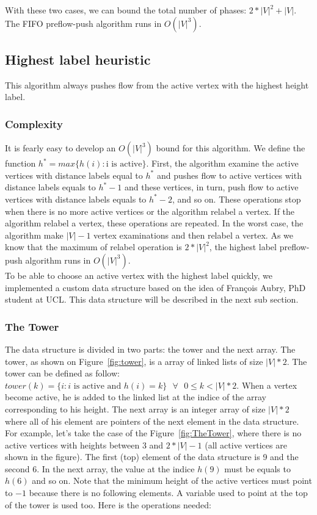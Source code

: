 With these two cases, we can bound the total number of phases: $2*|V|^2 + |V|$. The FIFO preflow-push algorithm runs in $O(|V|^3)$.

\subsection{Highest label heuristic}

This algorithm always pushes flow from the active vertex with the highest height label. 

\subsubsection{Complexity}

It is fearly easy to develop an $O(|V|^3)$ bound for this algorithm. We define the function $h^{*} = max\{h(i): \text{i is active}\}$. First, the algorithm examine the active vertices with distance labels equal to $h^{*}$ and pushes flow to active vertices with distance labels equals to $h^{*}-1$ and these vertices, in turn, push flow to active vertices with distance labels equals to $h^{*}-2$, and so on. These operations stop when there is no more active vertices or the algorithm relabel a vertex. If the algorithm relabel a vertex, these operations are repeated. In the worst case, the algorithm make $|V| - 1$ vertex examinations and then relabel a vertex. As we know that the maximum of relabel operation is $2*|V|^2$, the highest label preflow-push algorithm runs in $O(|V|^3)$.\\

To be able to choose an active vertex with the highest label quickly, we implemented a custom data structure based on the idea of Fran\c cois Aubry, PhD student at UCL. This data structure will be described in the next sub section.

\subsubsection{The Tower}

The data structure is divided in two parts: the tower and the next array. The tower, as shown on Figure~\ref{fig:tower}, is a array of linked lists of size $|V|*2$. The tower can be defined as follow: $tower(k) = \{i : i \text{ is active and } h(i) = k\} \text{ } \forall \text{ } 0 \le k < |V|*2$. When a vertex become active, he is added to the linked list at the indice of the array corresponding to his height. The next array is an integer array of size $|V|*2$ where all of his element are pointers of the next element in the data structure. For example, let's take the case of the Figure~\ref{fig:TheTower}, where there is no active vertices with heights between 3 and $2*|V|-1$ (all active vertices are shown in the figure). The first (top) element of the data structure is 9 and the second 6. In the next array, the value at the indice $h(9)$ must be equals to $h(6)$ and so on. Note that the minimum height of the active vertices must point to $-1$ because there is no following elements. A variable used to point at the top of the tower is used too. Here is the operations needed:

